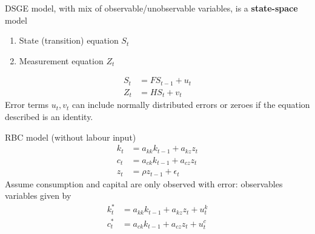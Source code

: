 \documentclass{beamer}
\begin{document}
\begin{frame}
  DSGE model, with mix of observable/unobservable variables, is a \textbf{state-space} model
\begin{enumerate}
  \item State (transition) equation $S_t$
  \item Measurement equation $Z_t$
\end{enumerate}
\begin{align*}
    S_t &= FS_{t-1} + u_t\\
    Z_t &= HS_t+v_t
\end{align*}
 \medskip
Error terms $u_t,v_t$ can include normally distributed errors or zeroes if the equation described is an identity.
\end{frame}

\begin{frame}
 RBC model (without labour input)  
\begin{align}
  k_t &= a_{kk}k_{t-1} + a_{kz}z_t\\
  c_t &= a_{ck}k_{t-1} + a_{cz}z_t\\
  z_t &= \rho z_{t-1} + \epsilon_t
\end{align}
\medskip
Assume consumption and capital are only observed with error: observables variables given by
\begin{align}
  k_t^* &= a_{kk}k_{t-1} + a_{kz}z_t + u_t^k\\
  c_t^* &= a_{ck}k_{t-1} + a_{cz}z_t + u_t^c\\  
\end{align}
\end{frame}
\end{document}
